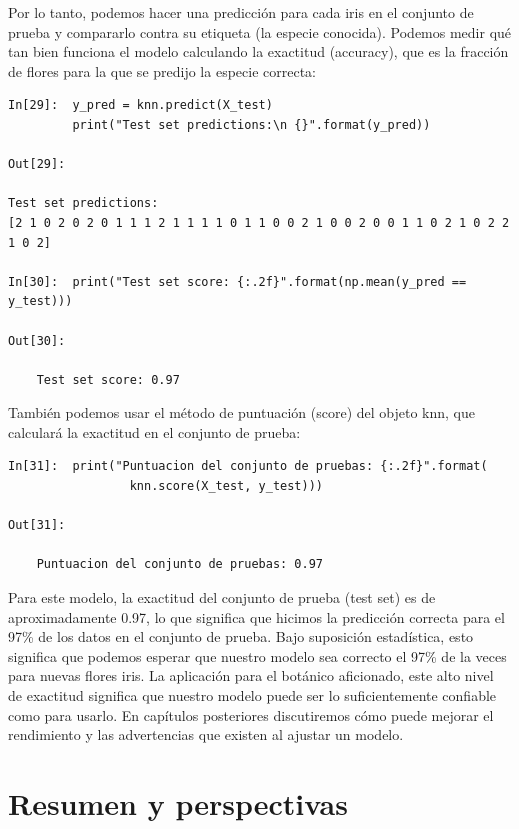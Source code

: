 Por lo tanto, podemos hacer una predicción para cada iris en el conjunto de prueba y compararlo contra su etiqueta (la especie conocida).  Podemos medir qué tan bien funciona el modelo calculando la  exactitud (accuracy), que es la fracción de flores para la que se predijo la especie correcta:\\

\begin{lstlisting}
In[29]:  y_pred = knn.predict(X_test)
         print("Test set predictions:\n {}".format(y_pred))

Out[29]:

Test set predictions:
[2 1 0 2 0 2 0 1 1 1 2 1 1 1 1 0 1 1 0 0 2 1 0 0 2 0 0 1 1 0 2 1 0 2 2 1 0 2]

In[30]:  print("Test set score: {:.2f}".format(np.mean(y_pred == y_test)))

Out[30]:

    Test set score: 0.97
\end{lstlisting}


También podemos  usar el método de puntuación (score)  del objeto {\ttfamily knn}, que calculará la exactitud en el conjunto de prueba:\\


\begin{lstlisting}
In[31]:  print("Puntuacion del conjunto de pruebas: {:.2f}".format(
                 knn.score(X_test, y_test)))

Out[31]:

    Puntuacion del conjunto de pruebas: 0.97
\end{lstlisting}


Para este modelo, la exactitud del conjunto de prueba (test set) es de aproximadamente 0.97, lo que significa que hicimos la  predicción correcta  para el 97\% de los datos en el conjunto de prueba. Bajo  suposición estadística, esto significa que podemos esperar que nuestro modelo sea correcto el 97\% de la veces para nuevas flores iris.  
 La aplicación para el botánico aficionado, este alto nivel de exactitud significa que nuestro  modelo puede ser lo suficientemente confiable como para usarlo. En capítulos posteriores discutiremos cómo puede mejorar el rendimiento y las advertencias que existen al ajustar un modelo.





\section{Resumen y perspectivas}

